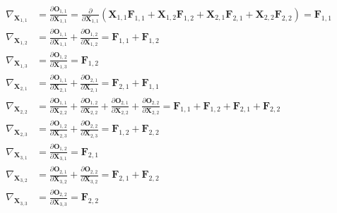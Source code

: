 $$
\begin{aligned}
  \nabla_{\mathbf{X}_{1,1}} &= \frac{\partial \mathbf{O}_{1,1}}{\partial \mathbf{X}_{1,1}} = \frac{\partial}{\partial \mathbf{X}_{1,1}} \left( \mathbf{X}_{1,1}\mathbf{F}_{1,1} + \mathbf{X}_{1,2}\mathbf{F}_{1,2} + \mathbf{X}_{2,1}\mathbf{F}_{2,1} + \mathbf{X}_{2,2}\mathbf{F}_{2,2} \right) = \mathbf{F}_{1,1} \\
  \nabla_{\mathbf{X}_{1,2}} &= \frac{\partial \mathbf{O}_{1,1}}{\partial \mathbf{X}_{1,1}} + \frac{\partial \mathbf{O}_{1,2}}{\partial \mathbf{X}_{1,2}} = \mathbf{F}_{1,1} + \mathbf{F}_{1,2} \\ 
  \nabla_{\mathbf{X}_{1,3}} &= \frac{\partial \mathbf{O}_{1,2}}{\partial \mathbf{X}_{1,3}} = \mathbf{F}_{1,2} \\
  \nabla_{\mathbf{X}_{2,1}} &= \frac{\partial \mathbf{O}_{1,1}}{\partial \mathbf{X}_{2,1}} + \frac{\partial \mathbf{O}_{2,1}}{\partial \mathbf{X}_{2,1}} = \mathbf{F}_{2,1} + \mathbf{F}_{1,1} \\ 
  \nabla_{\mathbf{X}_{2,2}} &= \frac{\partial \mathbf{O}_{1,1}}{\partial \mathbf{X}_{2,2}} + \frac{\partial \mathbf{O}_{1,2}}{\partial \mathbf{X}_{2,2}} + \frac{\partial \mathbf{O}_{2,1}}{\partial \mathbf{X}_{2,2}} + \frac{\partial \mathbf{O}_{2,2}}{\partial \mathbf{X}_{2,2}} = \mathbf{F}_{1,1} + \mathbf{F}_{1,2} + \mathbf{F}_{2,1} + \mathbf{F}_{2,2} \\
  \nabla_{\mathbf{X}_{2,3}} &= \frac{\partial \mathbf{O}_{1,2}}{\partial \mathbf{X}_{2,3}} + \frac{\partial \mathbf{O}_{2,2}}{\partial \mathbf{X}_{2,3}} = \mathbf{F}_{1,2} + \mathbf{F}_{2,2} \\
  \nabla_{\mathbf{X}_{3,1}} &= \frac{\partial \mathbf{O}_{1,2}}{\partial \mathbf{X}_{3,1}} = \mathbf{F}_{2,1} \\
  \nabla_{\mathbf{X}_{3,2}} &= \frac{\partial \mathbf{O}_{2,1}}{\partial \mathbf{X}_{3,2}} + \frac{\partial \mathbf{O}_{2,2}}{\partial \mathbf{X}_{3,2}} = \mathbf{F}_{2,1} + \mathbf{F}_{2,2} \\
  \nabla_{\mathbf{X}_{3,3}} &= \frac{\partial \mathbf{O}_{2,2}}{\partial \mathbf{X}_{3,3}} = \mathbf{F}_{2,2} \\
\end{aligned}
$$

